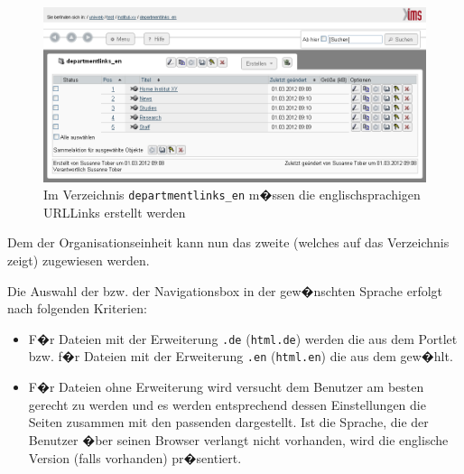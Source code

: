 \begin{figure}[!ht]
	\centering
		\includegraphics[width=\textwidth]{./images/deplink_en.png}
	\caption{Im Verzeichnis \texttt{departmentlinks\_en} m�ssen die englischsprachigen
URLLinks erstellt werden}
	\label{fig:deplinks_en}
\end{figure}

Dem  der Organisationseinheit kann nun das
zweite   (welches auf das Verzeichnis
 zeigt) zugewiesen werden.


Die Auswahl der  bzw. der Navigationsbox in der gew�nschten
Sprache erfolgt nach folgenden Kriterien:

\begin{itemize}
	\item {F�r Dateien mit der Erweiterung \nolinkurl{.de} (\nolinkurl{html.de}) werden die 
aus dem Portlet  bzw. f�r Dateien mit der
Erweiterung \nolinkurl{.en} (\nolinkurl{html.en}) die  aus dem 
 gew�hlt.}
\item {F�r Dateien ohne Erweiterung wird versucht dem Benutzer am besten gerecht
zu werden und es werden entsprechend dessen Einstellungen die Seiten
zusammen mit den passenden  dargestellt. Ist die Sprache,
die der Benutzer �ber seinen Browser verlangt nicht vorhanden, wird die
englische Version (falls vorhanden) pr�sentiert.}
\end{itemize}

